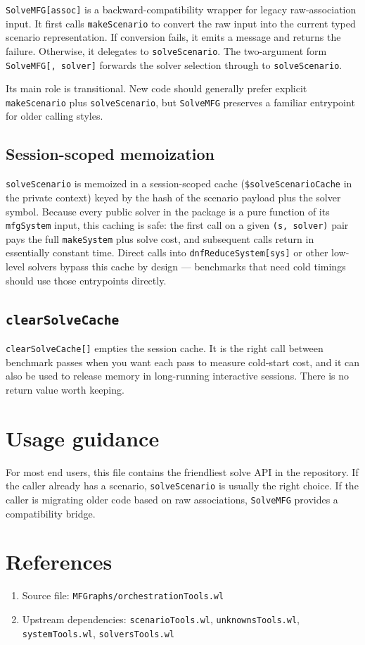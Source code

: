 \documentclass[11pt]{article}
\begin{document}
\texttt{SolveMFG[assoc]} is a backward-compatibility wrapper for legacy raw-association input. It first calls \texttt{makeScenario} to convert the raw input into the current typed scenario representation. If conversion fails, it emits a message and returns the failure. Otherwise, it delegates to \texttt{solveScenario}. The two-argument form \texttt{SolveMFG[\textellipsis, solver]} forwards the solver selection through to \texttt{solveScenario}.

Its main role is transitional. New code should generally prefer explicit \texttt{makeScenario} plus \texttt{solveScenario}, but \texttt{SolveMFG} preserves a familiar entrypoint for older calling styles.

\subsection*{Session-scoped memoization}

\texttt{solveScenario} is memoized in a session-scoped cache (\texttt{\$solveScenarioCache} in the private context) keyed by the hash of the scenario payload plus the solver symbol. Because every public solver in the package is a pure function of its \texttt{mfgSystem} input, this caching is safe: the first call on a given \texttt{(s, solver)} pair pays the full \texttt{makeSystem} plus solve cost, and subsequent calls return in essentially constant time. Direct calls into \texttt{dnfReduceSystem[sys]} or other low-level solvers bypass this cache by design --- benchmarks that need cold timings should use those entrypoints directly.

\subsection*{\texttt{clearSolveCache}}

\texttt{clearSolveCache[]} empties the session cache. It is the right call between benchmark passes when you want each pass to measure cold-start cost, and it can also be used to release memory in long-running interactive sessions. There is no return value worth keeping.

\section{Usage guidance}

For most end users, this file contains the friendliest solve API in the repository. If the caller already has a scenario, \texttt{solveScenario} is usually the right choice. If the caller is migrating older code based on raw associations, \texttt{SolveMFG} provides a compatibility bridge.

\section*{References}

\begin{enumerate}
\item Source file: \texttt{MFGraphs/orchestrationTools.wl}
\item Upstream dependencies: \texttt{scenarioTools.wl}, \texttt{unknownsTools.wl}, \texttt{systemTools.wl}, \texttt{solversTools.wl}
\end{enumerate}
\end{document}
